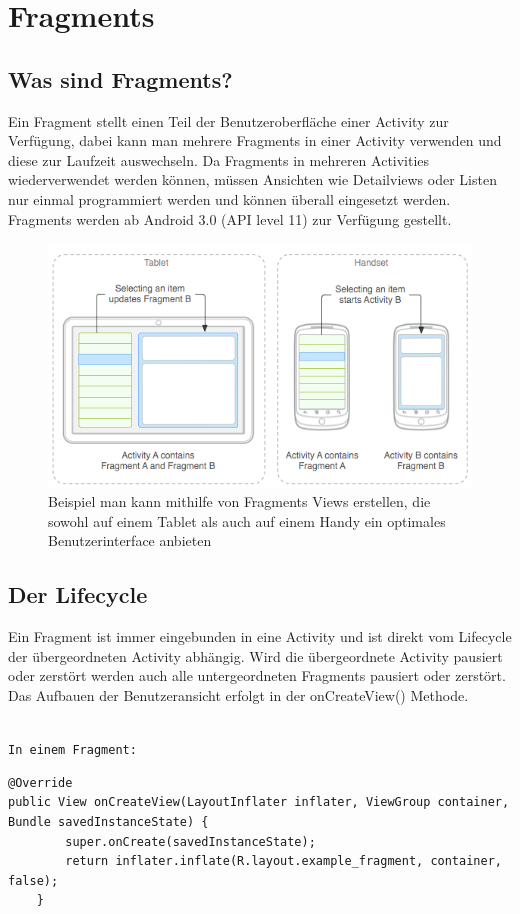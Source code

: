 \documentclass[FIPLY_base.tex]{subfiles}
\author{Andreas Denkmayr}
\date{20. Dezember 2015}
\begin{document}
\section{Fragments}
\subsection{Was sind Fragments?}
Ein Fragment stellt einen Teil der Benutzeroberfläche einer Activity zur Verfügung, dabei kann man mehrere Fragments in einer Activity verwenden und diese zur Laufzeit auswechseln.
Da Fragments in mehreren Activities wiederverwendet werden können, müssen Ansichten wie Detailviews oder Listen nur einmal programmiert werden und können überall eingesetzt werden.
Fragments werden ab Android 3.0 (API level 11) zur Verfügung gestellt.

\begin{figure}[h]
\includegraphics[scale=0.60]{img/fragments_modules}
\caption{Beispiel man kann mithilfe von Fragments Views erstellen, die sowohl auf einem Tablet als auch auf einem Handy ein optimales Benutzerinterface anbieten}
\end{figure}
\cite{adFragments}
\cite{adFragmentsGuide}

\newpage
\subsection{Der Lifecycle}
Ein Fragment ist immer eingebunden in eine Activity und ist direkt vom Lifecycle der übergeordneten Activity abhängig.
Wird die übergeordnete Activity pausiert oder zerstört werden auch alle untergeordneten Fragments pausiert oder zerstört.
Das Aufbauen der Benutzeransicht erfolgt in der onCreateView() Methode.

\ \\
\texttt{In einem Fragment:}
\begin{lstlisting}
@Override
public View onCreateView(LayoutInflater inflater, ViewGroup container, Bundle savedInstanceState) {
        super.onCreate(savedInstanceState);
        return inflater.inflate(R.layout.example_fragment, container, false);
    }
\end{lstlisting}
\end{document}
